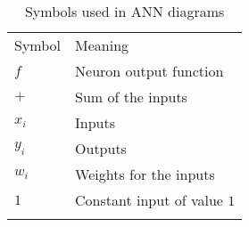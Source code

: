 
\begin{table}
\caption{Symbols used in ANN diagrams}
\label{tab.ann-symbols}
\begin{tabular}{p{2cm}p{4cm}}
\hline\noalign{\smallskip}
Symbol & Meaning \\
\noalign{\smallskip}\hline\noalign{\smallskip}
$f$ & Neuron output function\\
$+$ & Sum of the inputs\\
$x_i$ & Inputs\\
$y_i$ & Outputs\\
$w_{i}$ & Weights for the inputs\\
$1$ & Constant input of value $1$\\
\noalign{\smallskip}\hline\noalign{\smallskip}
\end{tabular}
\end{table}

